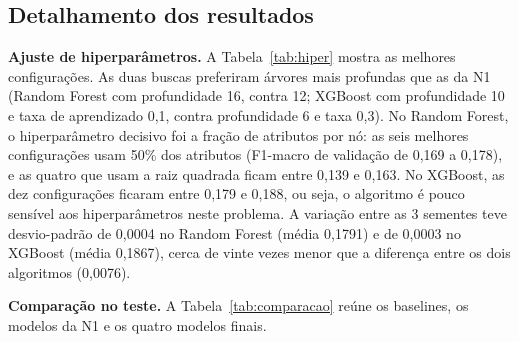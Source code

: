\documentclass[12pt]{article}
\begin{document}
\subsection{Detalhamento dos resultados}
\label{sec:desempenho}

\textbf{Ajuste de hiperparâmetros.} A Tabela~\ref{tab:hiper} mostra as melhores configurações. As duas buscas preferiram árvores mais profundas que as da N1 (Random Forest com profundidade 16, contra 12; XGBoost com profundidade 10 e taxa de aprendizado 0,1, contra profundidade 6 e taxa 0,3). No Random Forest, o hiperparâmetro decisivo foi a fração de atributos por nó: as seis melhores configurações usam 50\% dos atributos (F1-macro de validação de 0,169 a 0,178), e as quatro que usam a raiz quadrada ficam entre 0,139 e 0,163. No XGBoost, as dez configurações ficaram entre 0,179 e 0,188, ou seja, o algoritmo é pouco sensível aos hiperparâmetros neste problema. A variação entre as 3 sementes teve desvio-padrão de 0,0004 no Random Forest (média 0,1791) e de 0,0003 no XGBoost (média 0,1867), cerca de vinte vezes menor que a diferença entre os dois algoritmos (0,0076).

\begin{table}[ht]
\centering
\caption{Melhores hiperparâmetros encontrados pela busca aleatória (10 configurações por algoritmo, conjunto ampliado) e F1-macro na validação.}
\label{tab:hiper}
\small
{}
\end{table}

\textbf{Comparação no teste.} A Tabela~\ref{tab:comparacao} reúne os baselines, os modelos da N1 e os quatro modelos finais.
\end{document}
